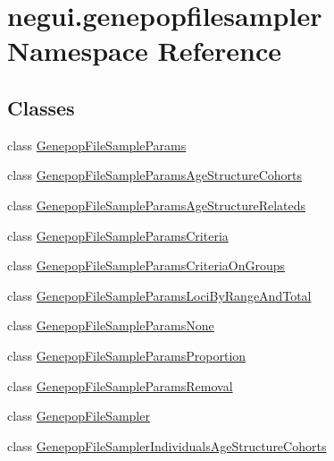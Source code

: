 \hypertarget{namespacenegui_1_1genepopfilesampler}{}\section{negui.\+genepopfilesampler Namespace Reference}
\label{namespacenegui_1_1genepopfilesampler}
\subsection*{Classes}
\begin{DoxyCompactItemize}
\item 
class \hyperlink{classnegui_1_1genepopfilesampler_1_1GenepopFileSampleParams}{Genepop\+File\+Sample\+Params}
\item 
class \hyperlink{classnegui_1_1genepopfilesampler_1_1GenepopFileSampleParamsAgeStructureCohorts}{Genepop\+File\+Sample\+Params\+Age\+Structure\+Cohorts}
\item 
class \hyperlink{classnegui_1_1genepopfilesampler_1_1GenepopFileSampleParamsAgeStructureRelateds}{Genepop\+File\+Sample\+Params\+Age\+Structure\+Relateds}
\item 
class \hyperlink{classnegui_1_1genepopfilesampler_1_1GenepopFileSampleParamsCriteria}{Genepop\+File\+Sample\+Params\+Criteria}
\item 
class \hyperlink{classnegui_1_1genepopfilesampler_1_1GenepopFileSampleParamsCriteriaOnGroups}{Genepop\+File\+Sample\+Params\+Criteria\+On\+Groups}
\item 
class \hyperlink{classnegui_1_1genepopfilesampler_1_1GenepopFileSampleParamsLociByRangeAndTotal}{Genepop\+File\+Sample\+Params\+Loci\+By\+Range\+And\+Total}
\item 
class \hyperlink{classnegui_1_1genepopfilesampler_1_1GenepopFileSampleParamsNone}{Genepop\+File\+Sample\+Params\+None}
\item 
class \hyperlink{classnegui_1_1genepopfilesampler_1_1GenepopFileSampleParamsProportion}{Genepop\+File\+Sample\+Params\+Proportion}
\item 
class \hyperlink{classnegui_1_1genepopfilesampler_1_1GenepopFileSampleParamsRemoval}{Genepop\+File\+Sample\+Params\+Removal}
\item 
class \hyperlink{classnegui_1_1genepopfilesampler_1_1GenepopFileSampler}{Genepop\+File\+Sampler}
\item 
class \hyperlink{classnegui_1_1genepopfilesampler_1_1GenepopFileSamplerIndividualsAgeStructureCohorts}{Genepop\+File\+Sampler\+Individuals\+Age\+Structure\+Cohorts}

\end{DoxyCompactItemize}
